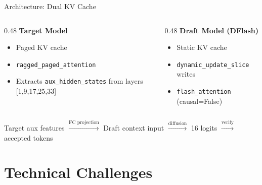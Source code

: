\documentclass[10pt]{beamer}
\begin{document}
\begin{frame}{Architecture: Dual KV Cache}
\begin{columns}[T]
\begin{column}{0.48\textwidth}
\textbf{Target Model}
\begin{itemize}
  \item Paged KV cache
  \item \texttt{ragged\_paged\_attention}
  \item Extracts \texttt{aux\_hidden\_states} from layers [1,9,17,25,33]
\end{itemize}
\end{column}
\begin{column}{0.48\textwidth}
\textbf{Draft Model (DFlash)}
\begin{itemize}
  \item Static KV cache
  \item \texttt{dynamic\_update\_slice} writes
  \item \texttt{flash\_attention} (causal=False)
\end{itemize}
\end{column}
\end{columns}

\vspace{1em}
\centering
\small
Target aux features $\xrightarrow{\text{FC projection}}$ Draft context input $\xrightarrow{\text{diffusion}}$ 16 logits $\xrightarrow{\text{verify}}$ accepted tokens
\end{frame}

\section{Technical Challenges}
\end{document}

